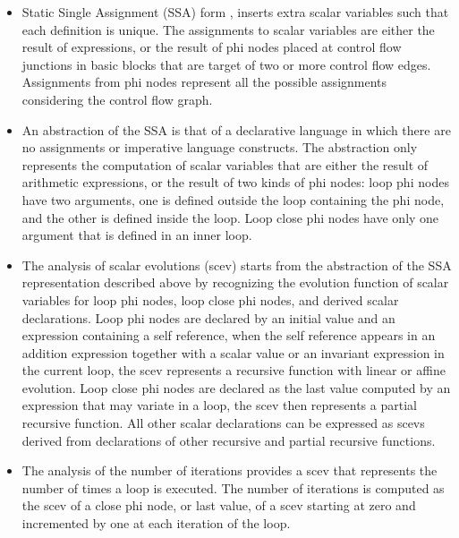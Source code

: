 \documentclass{sigplanconf}
\begin{document}
\begin{itemize}
  
\item Static Single Assignment (SSA) form \cite{cytron}, inserts extra scalar
  variables such that each definition is unique.  The assignments to scalar
  variables are either the result of expressions, or the result of phi nodes
  placed at control flow junctions in basic blocks that are target of two or
  more control flow edges.  Assignments from phi nodes represent all the
  possible assignments considering the control flow graph.

\item An abstraction of the SSA is that of a declarative language
  \cite{spop2007} in which there are no assignments or imperative language
  constructs.  The abstraction only represents the computation of scalar
  variables that are either the result of arithmetic expressions, or the result
  of two kinds of phi nodes: loop phi nodes have two arguments, one is defined
  outside the loop containing the phi node, and the other is defined inside the
  loop.  Loop close phi nodes have only one argument that is defined in an inner
  loop.

\item The analysis of scalar evolutions (scev) \cite{scev} starts from the
  abstraction of the SSA representation described above by recognizing the
  evolution function of scalar variables for loop phi nodes, loop close phi
  nodes, and derived scalar declarations.  Loop phi nodes are declared by an
  initial value and an expression containing a self reference, when the self
  reference appears in an addition expression together with a scalar value or an
  invariant expression in the current loop, the scev represents a recursive
  function with linear or affine evolution.  Loop close phi nodes are declared
  as the last value computed by an expression that may variate in a loop, the
  scev then represents a partial recursive function.  All other scalar
  declarations can be expressed as scevs derived from declarations of other
  recursive and partial recursive functions.

\item The analysis of the number of iterations \cite{scev} provides a scev that
  represents the number of times a loop is executed.  The number of iterations
  is computed as the scev of a close phi node, or last value, of a scev starting
  at zero and incremented by one at each iteration of the loop.


\end{itemize}
\end{document}
